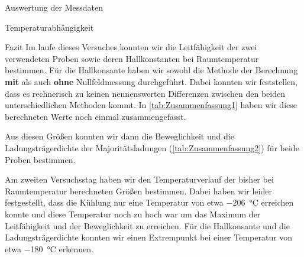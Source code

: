 \documentclass[pdftex, a4paper,11pt, twoside, ngerman]{report}
\begin{document}
\begin{chapter}{Auswertung der Messdaten}
\begin{section}{Temperaturabhängigkeit}
      
    \end{section}
    
    
    
    \newpage
    \begin{section}{Fazit}
      \label{chp:Fazit}
      Im laufe dieses Versuches konnten wir die Leitfähigkeit der zwei
      verwendeten Proben sowie deren Hallkonstanten bei Raumtemperatur
      bestimmen.
      Für die Hallkonsante haben wir sowohl die Methode der Berechnung
      \textbf{mit} als auch \textbf{ohne} Nullfeldmessung durchgeführt.
      Dabei konnten wir feststellen, dass es rechnerisch zu keinen
      nennenswerten Differenzen zwischen den beiden unterschiedlichen Methoden
      kommt.
      In \cref{tab:Zusammenfassung1} haben wir diese berechneten Werte noch
      einmal zusammengefasst.
      
      
      Aus diesen Größen konnten wir dann die Beweglichkeit und die
      Ladungsträgerdichte der Majoritätsladungen (\cref{tab:Zusammenfassung2})
      für beide Proben bestimmen.
      
      
      Am zweiten Versuchsstag haben wir den Temperaturverlauf der bisher bei
      Raumtemperatur berechneten Größen bestimmen.
      Dabei haben wir leider festgestellt, dass die Kühlung nur eine Temperatur
      von etwa \SI{-206}{\celsius} erreichen konnte und diese Temperatur noch
      zu hoch war um das Maximum der Leitfähigkeit und der Beweglichkeit
      zu erreichen.
      Für die Hallkonsante und die Ladungsträgerdichte konnten wir einen
      Extrempunkt bei einer Temperatur von etwa \SI{-180}{\celsius}
      erkennen.
      
    \end{section}
    
  \end{chapter}
  
  
  
%   
  
  
  
  \begin{thebibliography}{99}
    \scriptsize
    
  \end{thebibliography}
 
\end{document}
